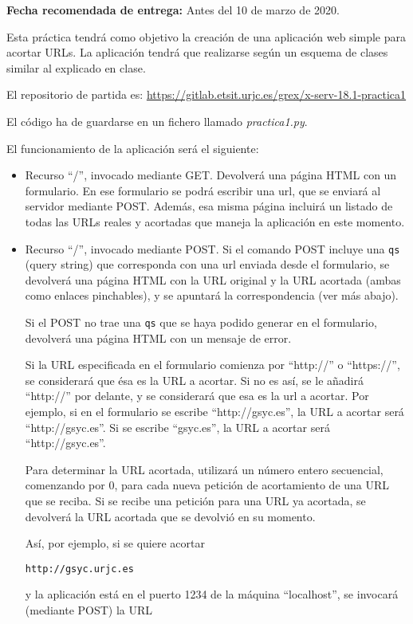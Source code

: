 \textbf{Fecha recomendada de entrega:} Antes del 10 de marzo de 2020.

Esta práctica tendrá como objetivo la creación de una aplicación web simple para acortar URLs. La aplicación tendrá que realizarse según un esquema de clases similar al explicado en clase.

El repositorio de partida es: \url{https://gitlab.etsit.urjc.es/grex/x-serv-18.1-practica1}

El código ha de guardarse en un fichero llamado \emph{practica1.py}.

El funcionamiento de la aplicación será el siguiente:

\begin{itemize}
\item Recurso ``/'', invocado mediante GET. Devolverá una página HTML con un formulario. En ese formulario se podrá escribir una url, que se enviará al servidor mediante POST. Además, esa misma página incluirá un listado de todas las URLs reales y acortadas que maneja la aplicación en este momento.

\item Recurso ``/'', invocado mediante POST. Si el comando POST incluye una \texttt{qs} (query string) que corresponda con una url enviada desde el formulario, se devolverá una página HTML con la URL original y la URL acortada (ambas como enlaces pinchables), y se apuntará la correspondencia (ver más abajo).

Si el POST no trae una \texttt{qs} que se haya podido generar en el formulario, devolverá una página HTML con un mensaje de error.

Si la URL especificada en el formulario comienza por ``http://'' o ``https://'', se considerará que ésa es la URL a acortar. Si no es así, se le añadirá ``http://'' por delante, y se considerará que esa es la url a acortar. Por ejemplo, si en el formulario se escribe ``http://gsyc.es'', la URL a acortar será ``http://gsyc.es''. Si se escribe ``gsyc.es'', la URL a acortar será ``http://gsyc.es''.

Para determinar la URL acortada, utilizará un número entero secuencial, comenzando por 0, para cada nueva petición de acortamiento de una URL que se reciba. Si se recibe una petición para una URL ya acortada, se devolverá la URL acortada que se devolvió en su momento.

Así, por ejemplo, si se quiere acortar

\verb|http://gsyc.urjc.es|

y la aplicación está en el puerto 1234 de la máquina ``localhost'', se invocará (mediante POST) la URL


\end{itemize}
